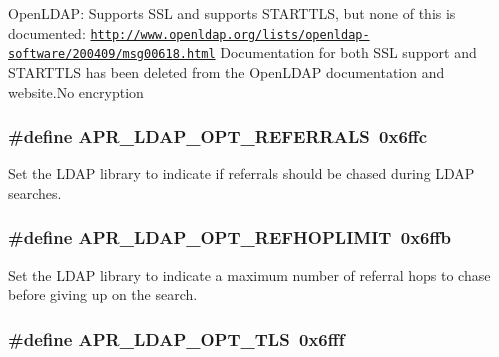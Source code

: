 Open\-L\-D\-A\-P\-: Supports S\-S\-L and supports S\-T\-A\-R\-T\-T\-L\-S, but none of this is documented\-: \href{http://www.openldap.org/lists/openldap-software/200409/msg00618.html}{\tt http\-://www.\-openldap.\-org/lists/openldap-\/software/200409/msg00618.\-html} Documentation for both S\-S\-L support and S\-T\-A\-R\-T\-T\-L\-S has been deleted from the Open\-L\-D\-A\-P documentation and website.\-No encryption \hypertarget{group___a_p_r___util___l_d_a_p_gaaa1fbd408f4d18c39ef5332f8d0f4745}{
\subsubsection[{A\-P\-R\-\_\-\-L\-D\-A\-P\-\_\-\-O\-P\-T\-\_\-\-R\-E\-F\-E\-R\-R\-A\-L\-S}]{\setlength{\rightskip}{0pt plus 5cm}\#define A\-P\-R\-\_\-\-L\-D\-A\-P\-\_\-\-O\-P\-T\-\_\-\-R\-E\-F\-E\-R\-R\-A\-L\-S~0x6ffc}}\label{group___a_p_r___util___l_d_a_p_gaaa1fbd408f4d18c39ef5332f8d0f4745}
Set the L\-D\-A\-P library to indicate if referrals should be chased during L\-D\-A\-P searches. \hypertarget{group___a_p_r___util___l_d_a_p_ga3dcf151b8758dae4ccf86d1cf26f4bfc}{
\subsubsection[{A\-P\-R\-\_\-\-L\-D\-A\-P\-\_\-\-O\-P\-T\-\_\-\-R\-E\-F\-H\-O\-P\-L\-I\-M\-I\-T}]{\setlength{\rightskip}{0pt plus 5cm}\#define A\-P\-R\-\_\-\-L\-D\-A\-P\-\_\-\-O\-P\-T\-\_\-\-R\-E\-F\-H\-O\-P\-L\-I\-M\-I\-T~0x6ffb}}\label{group___a_p_r___util___l_d_a_p_ga3dcf151b8758dae4ccf86d1cf26f4bfc}
Set the L\-D\-A\-P library to indicate a maximum number of referral hops to chase before giving up on the search. \hypertarget{group___a_p_r___util___l_d_a_p_gae3eda4797aebb6dadeb5876c0f7f4b0b}{
\subsubsection[{A\-P\-R\-\_\-\-L\-D\-A\-P\-\_\-\-O\-P\-T\-\_\-\-T\-L\-S}]{\setlength{\rightskip}{0pt plus 5cm}\#define A\-P\-R\-\_\-\-L\-D\-A\-P\-\_\-\-O\-P\-T\-\_\-\-T\-L\-S~0x6fff}}\label{group___a_p_r___util___l_d_a_p_gae3eda4797aebb6dadeb5876c0f7f4b0b}

